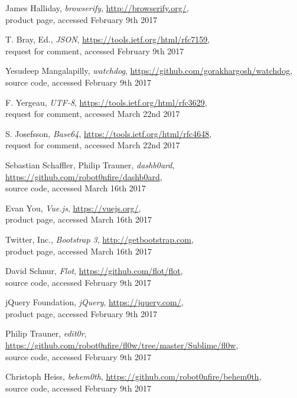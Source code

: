 \documentclass[conference]{IEEEtran}
\begin{document}
\begin{thebibliography}{1}
James Halliday, \emph{browserify}, \url{http://browserify.org/},\\ product page,
accessed February 9th 2017

T. Bray, Ed., \emph{JSON}, \url{https://tools.ietf.org/html/rfc7159},\\ request for comment,
accessed February 9th 2017

Yesudeep Mangalapilly, \emph{watchdog}, \url{https://github.com/gorakhargosh/watchdog}, source code,
accessed February 9th 2017

F. Yergeau, \emph{UTF-8}, \url{https://tools.ietf.org/html/rfc3629},\\ request for comment,
accessed March 22nd 2017

S. Josefsson, \emph{Base64}, \url{https://tools.ietf.org/html/rfc4648}, \\ request for comment,
accessed March 22nd 2017

Sebastian Schaffler, Philip Trauner, \emph{dashb0ard}, \url{https://github.com/robot0nfire/dashb0ard},\\ source code,
accessed March 16th 2017

Evan You, \emph{Vue.js}, \url{https://vuejs.org/},\\ product page,
accessed March 16th 2017

Twitter, Inc., \emph{Bootstrap 3}, \url{http://getbootstrap.com},\\ product page,
accessed March 16th 2017

David Schnur, \emph{Flot}, \url{https://github.com/flot/flot},\\ source code,
accessed February 9th 2017

jQuery Foundation, \emph{jQuery}, \url{https://jquery.com/},\\ product page,
accessed February 9th 2017

Philip Trauner, \emph{edit0r}, \url{https://github.com/robot0nfire/fl0w/tree/master/Sublime/fl0w},\\ source code,
accessed February 9th 2017

Christoph Heiss, \emph{behem0th}, \url{https://github.com/robot0nfire/behem0th},\\ source code,
accessed February 9th 2017

\end{thebibliography}
\end{document}
